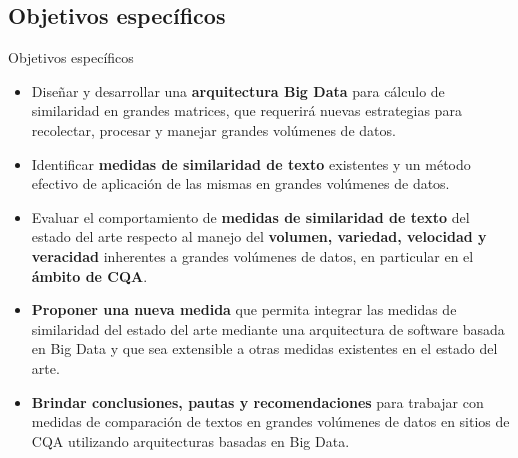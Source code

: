 \subsection{Objetivos específicos}
\begin{frame}{Objetivos específicos}
	\begin{tcolorbox}[colback=blue!5,colframe=blue!40!black,title=Objetivos específicos]
		\begin{scriptsize}
			\begin{itemize} [<+>]
				\item Diseñar y desarrollar una \textbf{arquitectura Big Data} para cálculo de similaridad en grandes matrices, que requerirá nuevas estrategias para recolectar, procesar y manejar grandes volúmenes de datos.
				\item Identificar \textbf{medidas de similaridad de texto} existentes y un método efectivo de aplicación de las mismas en grandes volúmenes de datos.
				\item Evaluar el comportamiento de \textbf{medidas de similaridad de texto} del estado del arte respecto al manejo del \textbf{volumen, variedad, velocidad y veracidad} inherentes a grandes volúmenes de datos, en particular en el \textbf{ámbito de CQA}.
				\item \textbf{Proponer una nueva medida} que permita integrar las medidas de similaridad del estado del arte mediante una arquitectura de software basada en Big Data y que sea extensible a otras medidas existentes en el estado del arte.
				\item \textbf{Brindar conclusiones, pautas y recomendaciones} para trabajar con medidas de comparación de textos en grandes volúmenes de datos en sitios de CQA utilizando arquitecturas basadas en Big Data.
			\end{itemize}
		\end{scriptsize}
	\end{tcolorbox}
\end{frame}